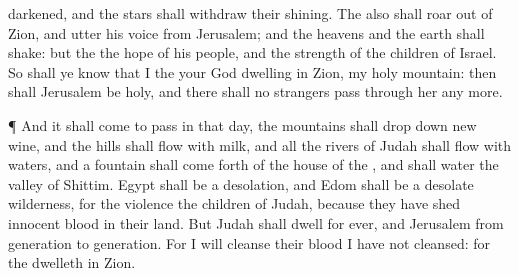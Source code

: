 {darkened, and the
stars shall
withdraw their
shining.
The
{} also shall
roar out of
Zion, and
utter his
voice from
Jerusalem; and the
heavens and the
earth shall
shake: but the
{}
{} the
hope of his
people, and the
strength of the
children of
Israel.
So shall ye
know that I
{} the
{} your
God
dwelling in
Zion, my
holy
mountain: then shall
Jerusalem be
holy, and there shall no
strangers pass
through her any more.
\par }{\PP {}¶ And it shall come to pass in that
day,
{} the
mountains shall drop
down new
wine, and the
hills shall
flow with
milk, and all the
rivers of
Judah shall
flow with
waters, and a
fountain shall come
forth of the
house of the
{}, and shall
water the
valley of
Shittim.
Egypt shall be a
desolation, and
Edom shall be a
desolate
wilderness, for the
violence
{} the
children of
Judah, because they have
shed
innocent
blood in their
land.
But
Judah shall
dwell for
ever, and
Jerusalem from
generation to
generation.
For I will
cleanse their
blood
{} I have not
cleansed: for the
{}
dwelleth in
Zion.
\par }